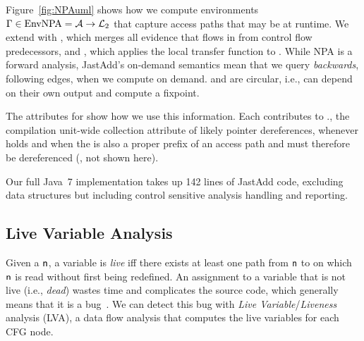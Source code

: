 Figure~\ref{fig:NPAuml} shows how we compute
environments $\Gamma \in \textrm{EnvNPA} = \mathcal{A} \to \mathcal{L}_2$
that capture access paths that may be  at runtime.
We extend  with
, which merges all
evidence that flows in from control flow predecessors, and , which applies the local transfer function  to
.  While NPA is a forward analysis, JastAdd's on-demand semantics mean that we
query \emph{backwards}, following  edges, when we compute  on demand.
 and  are circular, i.e., can depend on their own output
and compute a fixpoint.

The attributes for  show how we use this information.
Each  contributes to ., the
compilation unit-wide collection attribute of likely  pointer
dereferences, whenever  holds and when the  is also a proper prefix
of an access path and must therefore be dereferenced (,
not shown here).

Our full Java~7 implementation takes up 142 lines of JastAdd code,
excluding data structures but
including control sensitive analysis handling and reporting.



\subsection{Live Variable Analysis}\label{sec:lva}
Given a  $\mathsf{n}$, a variable is \emph{live} iff there exists at least one path from $\mathsf{n}$ to  on which $\mathsf{n}$ is read without first being redefined.
An assignment to a variable that is not live (i.e., \emph{dead}) wastes time and complicates the source code, which generally means that it is a bug~\cite{reichenbach2021ticks}.
We can detect this bug with
\emph{Live Variable}/\emph{Liveness} analysis (LVA), a data flow analysis that computes the live variables for each CFG node.


